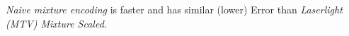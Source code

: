 \emph{Naive mixture encoding} is faster and has similar (lower) Error than \emph{Laserlight (MTV) Mixture Scaled}.


%

